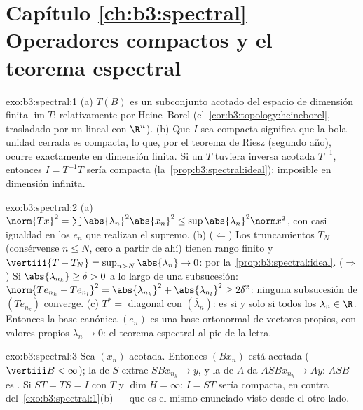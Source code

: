 \section*{Capítulo \ref{ch:b3:spectral} --- Operadores compactos
y el teorema espectral}

\begin{solution}{exo:b3:spectral:1}
(a) $T(B)$ es un subconjunto acotado del espacio de dimensión finita
$\operatorname{im}T$: relativamente
 por Heine--Borel
(el~\cref{cor:b3:topology:heineborel}, trasladado por un
 lineal con $\R^n$).
(b) Que $I$ sea compacta significa que
la bola unidad cerrada es compacta, lo
que, por el teorema de Riesz (segundo año), ocurre exactamente en
dimensión finita. Si un $T$ 
tuviera inversa acotada $T^{-1}$, entonces $I = T^{-1}T$ sería
compacta
(la~\cref{prop:b3:spectral:ideal}): imposible en dimensión infinita.
\end{solution}

\begin{solution}{exo:b3:spectral:2}
(a) $\norm{Tx}^2 = \sum\abs{\lambda_n}^2\abs{x_n}^2 \leq
\sup\abs{\lambda_n}^2\norm x^2$, con casi igualdad en los $e_n$ que
realizan el supremo. (b) ($\Leftarrow$) Los truncamientos $T_N$
(consérvense $n \leq N$, cero a partir de ahí) tienen rango finito y
$\vertiii{T - T_N} =
\sup_{n>N}\abs{\lambda_n} \to 0$:
 por
la~\cref{prop:b3:spectral:ideal}. ($\Rightarrow$) Si
$\abs{\lambda_{n_k}} \geq \delta > 0$ a lo largo de una subsucesión:
$\norm{Te_{n_k} - Te_{n_l}}^2 = \abs{\lambda_{n_k}}^2 +
\abs{\lambda_{n_l}}^2 \geq 2\delta^2$: ninguna subsucesión de
$(Te_{n_k})$ converge. (c) $T^* = $ diagonal con $(\bar\lambda_n)$: es
 si y solo si todos los
$\lambda_n \in \R$. Entonces la base canónica $(e_n)$ es una base
ortonormal de vectores propios, con valores propios $\lambda_n \to
0$: el teorema espectral al pie de la letra.
\end{solution}

\begin{solution}{exo:b3:spectral:3}
Sea $(x_n)$ acotada. Entonces $(Bx_n)$ está acotada
($\vertiii B < \infty$); la  de $S$ extrae $SBx_{n_k} \to y$,
y la  de $A$ da
$ASBx_{n_k} \to
Ay$: $ASB$ es . Si
$ST = TS = I$ con $T$  y
$\dim H = \infty$: $I = ST$ sería
compacta, en contra
del~\cref{exo:b3:spectral:1}(b) --- que es el mismo enunciado visto
desde el otro lado.
\end{solution}

